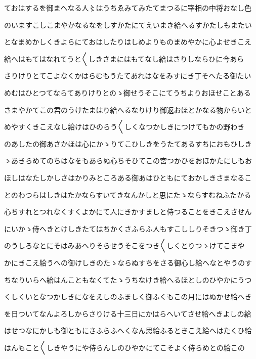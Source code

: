 \documentclass[a4paper,11pt,landscape]{ltjtarticle}
\begin{document}
\par\medskip
ておはするを御まへなる人〻はうちゑみてみたてまつるに宰相の中将おなし色
\par\medskip
のいますこしこまやかなるなをしすかたにてえいまき給へるすかたしもまたい
\par\medskip
となまめかしくきよらにておはしたりはしめよりものまめやかに心よせきこえ
\par\medskip
給へはもてはなれてうと〱しきさまにはもてなし給はさりしならひに今あら
\par\medskip
さりけりとてこよなくかはらむもうたてあれはなをみすにき丁そへたる御たい
\par\medskip
めむはひとつてならてありけりとのゝ御せうそこにてうちよりおほせことある
\par\medskip
さまやかてこの君のうけたまはり給へるなりけり御返おほとかなる物からいと
\par\medskip
めやすくきこえなし給けはひのらう〱しくなつかしきにつけてもかの野わき
\par\medskip
のあしたの御あさかほは心にかゝりてこひしきをうたてあるすちにおもひしき
\par\medskip
ゝあきらめてのちはなをもあらぬ心ちそひてこの宮つかひをおほかたにしもお
\par\medskip
ほしはなたしかしさはかりみところある御あはひともにておかしきさまなるこ
\par\medskip
とのわつらはしきはたかならすいてきなんかしと思にたゝならすむねふたかる
\par\medskip
心ちすれとつれなくすくよかにて人にきかすましと侍つることをきこえさせん
\par\medskip
にいかゝ侍へきとけしきたてはちかくさふらふ人もすこししりそきつゝ御き丁
\par\medskip
のうしろなとにそはみあへりそらせうそこをつき〱しくとりつゝけてこまや
\par\medskip
かにきこえ給うへの御けしきのたゝならぬすちをさる御心し給へなとやうのす
\par\medskip
ちなりいらへ給はんこともなくてたゝうちなけき給へるほとしのひやかにうつ
\par\medskip
くしくいとなつかしきになをえしのふましく御ふくもこの月にはぬかせ給へき
\par\medskip
を日ついてなんよろしからさりける十三日にかはらへいてさせ給へきよしの給
\par\medskip
はせつなにかしも御ともにさふらふへくなん思給ふるときこえ給へはたくひ給
\par\medskip
はんもこと〱しきやうにや侍らんしのひやかにてこそよく侍らめとの給この
\par\medskip
\end{document}
